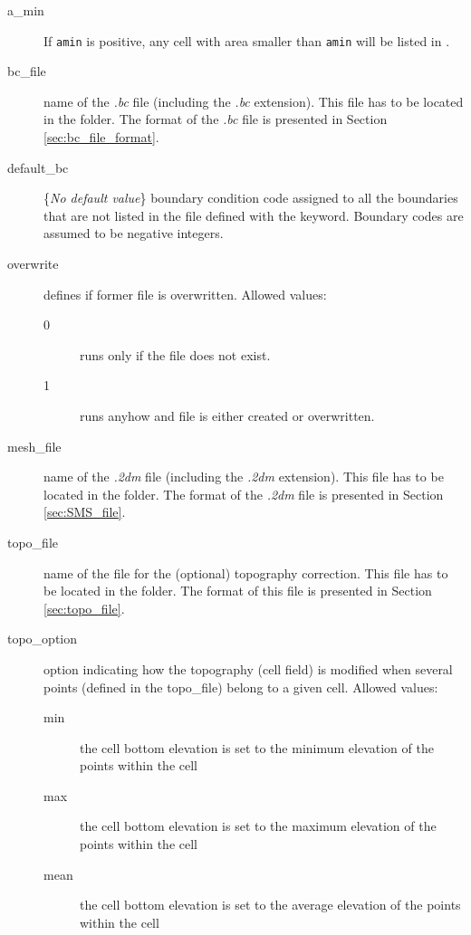 \begin{description}
\item[a\_min]  If \texttt{amin} is positive, any cell with area smaller than \texttt{amin} will be listed in  . 

\item[bc\_file] \nodefaultvalue name of the  \emph{.bc} file (including the \emph{.bc} extension). This file has to be located in the  folder. The format of the \emph{.bc} file is presented in Section \ref{sec:bc_file_format}.

\item[default\_bc] \{\textit{No default value}\} boundary condition code assigned to all the boundaries that are not listed in the file defined with the  keyword. Boundary codes are assumed to be negative integers.

\item[overwrite]  defines if former  file is overwritten. Allowed values:
\begin{description}
\item [0] \swConverter runs only if the file  does not exist.
\item [1] \swConverter runs anyhow and file  is either created or overwritten.
\end{description}

\item[mesh\_file] \nodefaultvalue name of the \emph{.2dm}  file (including the \emph{.2dm} extension). This file has to be located in the  folder. The format of the \emph{.2dm} file is presented in Section \ref{sec:SMS_file}.

\item[topo\_file] \nodefaultvalue name of the file for the (optional) topography correction. This file has to be located in the  folder. The format of this file is presented in Section \ref{sec:topo_file}.  

\item[topo\_option] \nodefaultvalue option indicating how the topography (cell field) is modified when several points (defined in the topo\_file) belong to a given cell. Allowed values:
\begin{description}
\item [min] the cell bottom elevation is set to the minimum elevation of the points within the cell
\item [max] the cell bottom elevation is set to the maximum elevation of the points within the cell
\item [mean] the cell bottom elevation is set to the average elevation of the points within the cell
\end{description}
\end{description}

